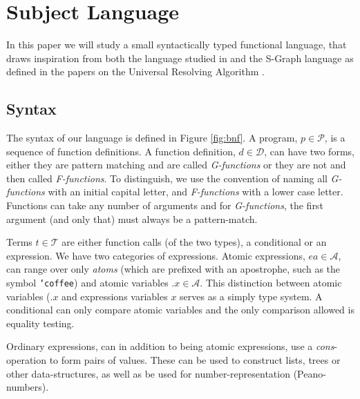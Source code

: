\documentclass[10pt]{../sigplanconf}
\begin{document}
\section{Subject Language}
In this paper we will study a small syntactically typed functional
language, that draws inspiration from both the language studied in
\cite{sorensen1998introduction} and the S-Graph language as defined in
the papers on the Universal Resolving Algorithm
\cite{abramov2000universal, abramov2002universal,
  abramov2002principles}.

\subsection{Syntax}
The syntax of our language is defined in Figure \ref{fig:bnf}. A
program, $p \in \mathcal{P}$, is a sequence of function definitions. A
function definition, $d \in \mathcal{D}$, can have two forms, either
they are pattern matching and are called \textit{G-functions} or they
are not and then called \textit{F-functions}. To distinguish, we use
the convention of naming all \textit{G-functions} with an initial
capital letter, and \textit{F-functions} with a lower case
letter. Functions can take any number of arguments and for
\textit{G-functions}, the first argument (and only that) must always
be a pattern-match.

Terms $t \in \mathcal{T}$ are either function calls (of the two
types), a conditional or an expression. We have two categories of
expressions. Atomic expressions, $ea \in \mathcal{A}$, can range over
only \textit{atoms} (which are prefixed with an apostrophe, such as
the symbol \texttt{'coffee}) and atomic variables $\texttt{.}x \in
\mathcal{A}$. This distinction between atomic variables
($\texttt{.}x$ and expressions variables $x$ serves as a simply type
system. A conditional can only compare atomic variables and the only
comparison allowed is equality testing.

Ordinary expressions, can in addition to being atomic expressions, use
a \textit{cons}-operation to form pairs of values. These can be used
to construct lists, trees or other data-structures, as well as be used
for number-representation (Peano-numbers).
\end{document}
